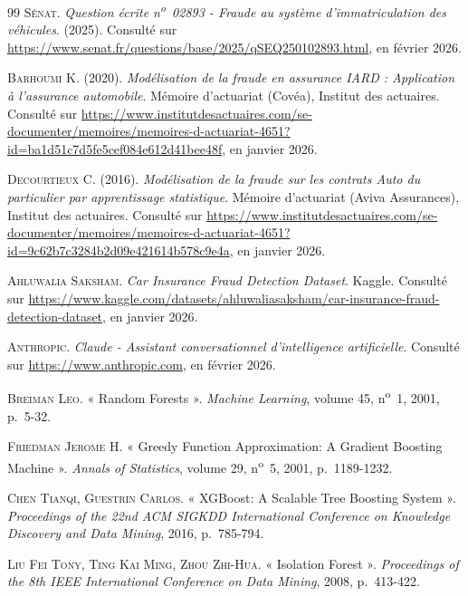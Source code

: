 \begin{thebibliography}{99}
\textsc{Sénat}. \textit{Question écrite n\textsuperscript{o}~02893 - Fraude au système d'immatriculation des véhicules}. (2025). Consulté sur \url{https://www.senat.fr/questions/base/2025/qSEQ250102893.html}, en février 2026.


\textsc{Barhoumi K.} (2020). \textit{Modélisation de la fraude en assurance IARD : Application à l'assurance automobile}. Mémoire d'actuariat (Covéa), Institut des actuaires. Consulté sur \url{https://www.institutdesactuaires.com/se-documenter/memoires/memoires-d-actuariat-4651?id=ba1d51c7d5fe5cef084e612d41bee48f}, en janvier 2026.

\textsc{Decourtieux C.} (2016). \textit{Modélisation de la fraude sur les contrats Auto du particulier par apprentissage statistique}. Mémoire d'actuariat (Aviva Assurances), Institut des actuaires. Consulté sur \url{https://www.institutdesactuaires.com/se-documenter/memoires/memoires-d-actuariat-4651?id=9c62b7c3284b2d09e421614b578c9e4a}, en janvier 2026.


\textsc{Ahluwalia Saksham}. \textit{Car Insurance Fraud Detection Dataset}. Kaggle. Consulté sur \url{https://www.kaggle.com/datasets/ahluwaliasaksham/car-insurance-fraud-detection-dataset}, en janvier 2026.

\textsc{Anthropic}. \textit{Claude - Assistant conversationnel d'intelligence artificielle}. Consulté sur \url{https://www.anthropic.com}, en février 2026.


\textsc{Breiman Leo}. « Random Forests ». \textit{Machine Learning}, volume 45, n\textsuperscript{o}~1, 2001, p.~5-32.

\textsc{Friedman Jerome H.} « Greedy Function Approximation: A Gradient Boosting Machine ». \textit{Annals of Statistics}, volume 29, n\textsuperscript{o}~5, 2001, p.~1189-1232.

\textsc{Chen Tianqi, Guestrin Carlos}. « XGBoost: A Scalable Tree Boosting System ». \textit{Proceedings of the 22nd ACM SIGKDD International Conference on Knowledge Discovery and Data Mining}, 2016, p.~785-794.

\textsc{Liu Fei Tony, Ting Kai Ming, Zhou Zhi-Hua}. « Isolation Forest ». \textit{Proceedings of the 8th IEEE International Conference on Data Mining}, 2008, p.~413-422.


\end{thebibliography}
